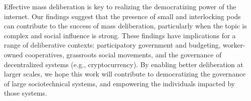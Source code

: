 Effective mass deliberation is key to realizing the democratizing power of the internet. Our findings suggest that the presence of small and interlocking pods can contribute to the success of mass deliberation, particularly when the topic is complex and social influence is strong. These findings have implications for a range of deliberative contexts: participatory government and budgeting, worker-owned cooperatives, grassroots social movements, and the governance of decentralized systems (e.g., cryptocurrency). By enabling better deliberation at larger scales, we hope this work will contribute to democratizing the governance of large sociotechnical systems, and empowering the individuals impacted by those systems.


